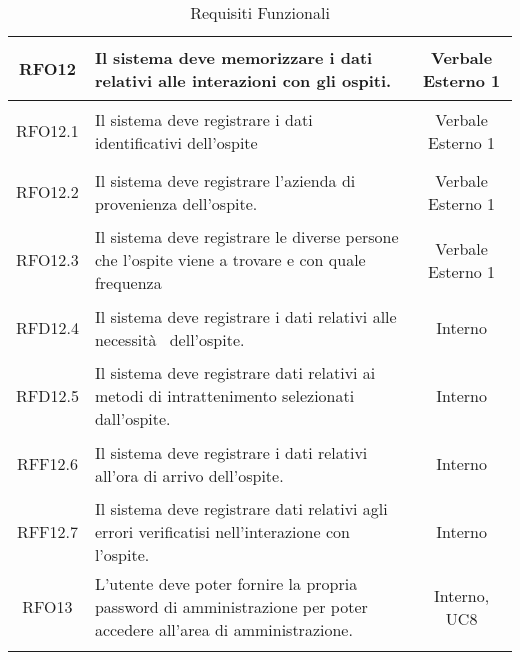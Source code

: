 \begin{longtable}{|c|>{\centering}m{7cm}|c|}
\hypertarget{RFO12}{RFO12} & Il sistema deve memorizzare i dati relativi alle interazioni con gli ospiti. & Verbale Esterno 1\\ \hline
\hypertarget{RFO12.1}{RFO12.1} & Il sistema deve registrare i dati identificativi dell'ospite & Verbale Esterno 1\\ \hline
\hypertarget{RFO12.2}{RFO12.2} & Il sistema deve registrare l'azienda di provenienza dell'ospite. & Verbale Esterno 1\\ \hline
\hypertarget{RFO12.3}{RFO12.3} & Il sistema deve registrare le diverse persone che l'ospite viene a trovare e con quale frequenza & Verbale Esterno 1\\ \hline
\hypertarget{RFD12.4}{RFD12.4} & Il sistema deve registrare i dati relativi alle necessità  dell'ospite. & Interno\\ \hline
\hypertarget{RFD12.5}{RFD12.5} & Il sistema deve registrare dati relativi ai metodi di intrattenimento selezionati dall'ospite. & Interno\\ \hline
\hypertarget{RFF12.6}{RFF12.6} & Il sistema deve registrare i dati relativi all'ora di arrivo dell'ospite. & Interno\\ \hline
\hypertarget{RFF12.7}{RFF12.7} & Il sistema deve registrare dati relativi agli errori verificatisi nell'interazione con l'ospite. & Interno\\ \hline
\hypertarget{RFO13}{RFO13} & L'utente deve poter fornire la propria password di amministrazione per poter accedere all'area di amministrazione. & Interno, UC8\\ \hline

\caption[Requisiti Funzionali]{Requisiti Funzionali}
\label{tabella:req0}
\end{longtable}
\clearpage
